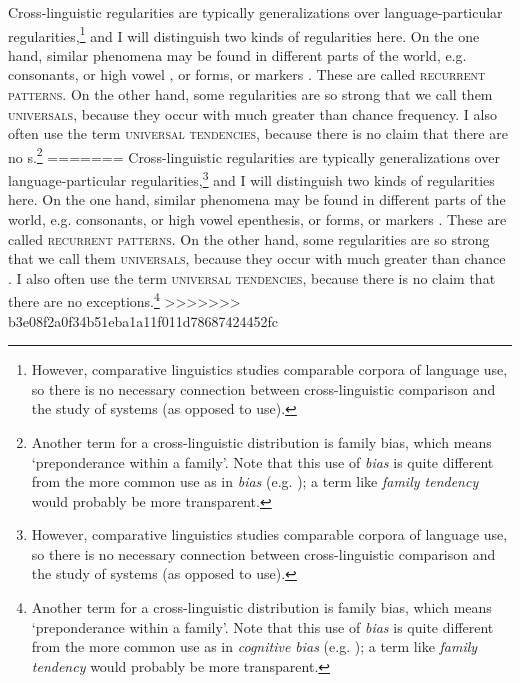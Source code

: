 \documentclass[output=paper]{langsci/langscibook}
\begin{document}
Cross-linguistic regularities are typically generalizations over language-particular regularities,\footnote{However, comparative  linguistics studies comparable corpora of language use, so there is no necessary connection between cross-linguistic comparison and the study of systems (as opposed to use).} and I will distinguish two kinds of regularities here. On the one hand, similar phenomena may be found in different parts of the world, e.g.  consonants, or high vowel , or   forms, or  markers \citep{Creissels2014}. These are called \textsc{recurrent patterns}. On the other hand, some regularities are so strong that we call them \textsc{universals}, because they occur with much greater than chance frequency. I also often use the term \textsc{universal tendencies}, because there is no claim that there are no s.\footnote{Another term for a cross-linguistic distribution is  family bias, which means ‘preponderance within a family’. Note that this use of \textit{bias} is quite different from the more common use as in \textit{ bias} (e.g. \citealt{TverskyKahneman1974}); a term like \textit{family tendency} would probably be more transparent.}
=======
Cross-linguistic regularities are typically generalizations over language-particular regularities,\footnote{However, comparative  linguistics studies comparable corpora of language use, so there is no necessary connection between cross-linguistic comparison and the study of systems (as opposed to use).} and I will distinguish two kinds of regularities here. On the one hand, similar phenomena may be found in different parts of the world, e.g.  consonants, or high vowel epenthesis, or   forms, or  markers \citep{Creissels2014}. These are called \textsc{recurrent patterns}. On the other hand, some regularities are so strong that we call them \textsc{universals}, because they occur with much greater than chance . I also often use the term \textsc{universal tendencies}, because there is no claim that there are no exceptions.\footnote{Another term for a cross-linguistic distribution is  family bias, which means ‘preponderance within a family’. Note that this use of \textit{bias} is quite different from the more common use as in \textit{cognitive bias} (e.g. \citealt{TverskyKahneman1974}); a term like \textit{family tendency} would probably be more transparent.}
>>>>>>> b3e08f2a0f34b51eba1a11f011d78687424452fc
\largerpage[2]
\end{document}

